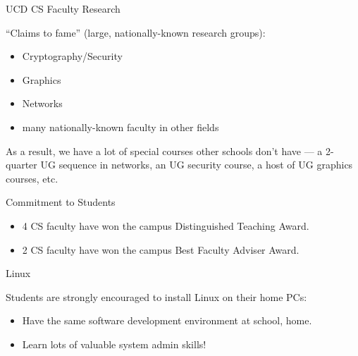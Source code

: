 \documentclass[%
pdf,
colorBG,
slideColor,
azure
]{prosper}
\begin{document}
\begin{slide}{UCD CS Faculty Research}

``Claims to fame'' (large, nationally-known research groups):

\begin{itemize}

\item Cryptography/Security

\item Graphics

\item Networks 

\item many nationally-known faculty in other fields

\end{itemize}

As a result, we have a lot of special courses other schools don't have
--- a 2-quarter UG sequence in networks, an UG security course, a host
of UG graphics courses, etc.

\end{slide}


\begin{slide}{Commitment to Students}

\begin{itemize}

\item 4 CS faculty have won the campus Distinguished Teaching Award.

\item 2 CS faculty have won the campus Best Faculty Adviser Award.

\end{itemize}

\end{slide}


\begin{slide}{Linux}

Students are strongly encouraged to install Linux on their home PCs:

\begin{itemize}

\item Have the same software development environment at school, home.

\item Learn lots of valuable system admin skills!

\end{itemize}

\end{slide}
\end{document}
